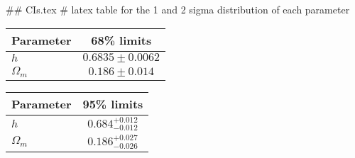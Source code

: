## CIs.tex
# latex table for the 1 and 2 sigma distribution of each parameter

\begin{tabular} { l  c}
 Parameter &  68\% limits\\
\hline
{\boldmath$h              $} & $0.6835\pm 0.0062          $\\
{\boldmath$\Omega_m       $} & $0.186\pm 0.014            $\\
\hline
\end{tabular}

\begin{tabular} { l  c}
 Parameter &  95\% limits\\
\hline
{\boldmath$h              $} & $0.684^{+0.012}_{-0.012}   $\\
{\boldmath$\Omega_m       $} & $0.186^{+0.027}_{-0.026}   $\\
\hline
\end{tabular}
